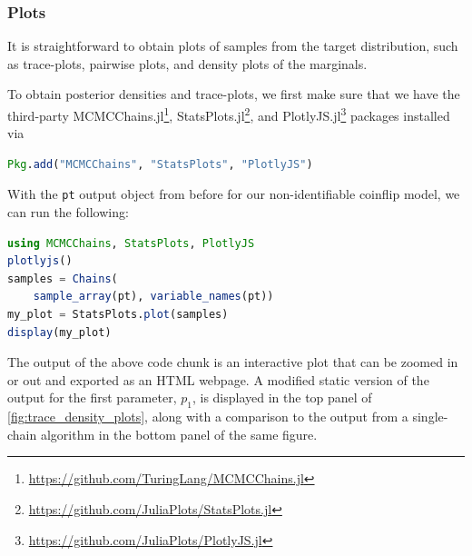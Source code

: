 \subsubsection{Plots}
It is straightforward to obtain plots of samples from the target distribution, 
such as trace-plots, pairwise plots, and density plots of the marginals. 

\medskip 
To obtain posterior densities and trace-plots, we first 
make sure that we have the third-party 
MCMCChains.jl\footnote{\url{https://github.com/TuringLang/MCMCChains.jl}}, 
StatsPlots.jl\footnote{\url{https://github.com/JuliaPlots/StatsPlots.jl}}, and 
PlotlyJS.jl\footnote{\url{https://github.com/JuliaPlots/PlotlyJS.jl}} 
packages installed via
\begin{lstlisting}[language=Julia]
Pkg.add("MCMCChains", "StatsPlots", "PlotlyJS")
\end{lstlisting}

With the \texttt{pt} output object from before for our non-identifiable coinflip model, 
we can run the following:
\begin{lstlisting}[language=Julia]
using MCMCChains, StatsPlots, PlotlyJS
plotlyjs()
samples = Chains(
    sample_array(pt), variable_names(pt))
my_plot = StatsPlots.plot(samples)
display(my_plot)
\end{lstlisting}
The output of the above code chunk is an interactive plot that can be zoomed in or out
and exported as an HTML webpage. 
A modified static version of the output for the first parameter, $p_1$, 
is displayed in the top panel of \cref{fig:trace_density_plots},
along with a comparison to the output from a single-chain algorithm in the bottom 
panel of the same figure.


